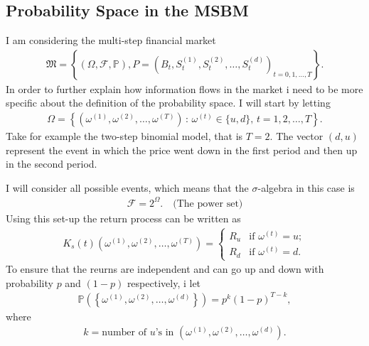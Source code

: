 \documentclass{article}
\theoremstyle{definition}
\numberwithin{equation}{section}
\begin{document}
\subsection{Probability Space in the MSBM}
I am considering the multi-step financial market
\begin{align}
    \mathfrak{M} = \left\{
        (\Omega, \mathscr{F}, \mathbb{P}),
        P = \left(
            B_t, S_t^{(1)}, S_t^{(2)}, \ldots, S_t^{(d)}
        \right)_{t = 0,1, \ldots, T}
    \right\}.
\end{align}
In order to further explain how information flows in the market i need to be more specific about the definition of the probability space.
I will start by letting
\begin{align}
    \Omega = \left\{
        \left(
            \omega^{(1)}, \omega^{(2)}, \ldots, \omega^{(T)}
        \right)
        \, : \,
        \omega^{(t)} \in \{u,d\}, \, t = 1, 2, \ldots, T
    \right\}.
\end{align}
Take for example the two-step binomial model, that is $T = 2$.
The vector $(d,u)$ represent the event in which the price went down in the first period and then up in the second period.

I will consider all possible events, which means that the $\sigma$-algebra in this case is
\begin{align}
    \mathscr{F} = 2^{\Omega}. \quad \text{(The power set)}
\end{align}
Using this set-up the return process can be written as
\begin{align}
    K_s(t)(\omega^{(1)}, \omega^{(2)}, \ldots, \omega^{(T)}) =
    \begin{cases}
        R_u & \text{if } \omega^{(t)} = u; \\
        R_d & \text{if } \omega^{(t)} = d. 
    \end{cases}
\end{align}
To ensure that the reurns are independent and can go up and down with probability $p$ and $(1-p)$ respectively, i let
\begin{align}
    \mathbb{P}\left(
        \left\{
            \omega^{(1)}, \omega^{(2)}, \ldots, \omega^{(d)}
        \right\}
    \right) =
    p^k(1 - p)^{T-k},
\end{align}
where
\begin{align}
    k = \text{number of $u$'s in } \left(\omega^{(1)}, \omega^{(2)}, \ldots, \omega^{(d)}\right). 
\end{align}
\end{document}
